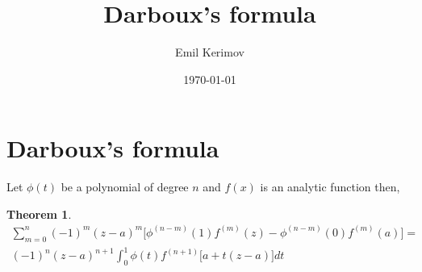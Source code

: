 \documentclass[a4paper]{article}
\title{Darboux's formula}
\author{Emil Kerimov}
\date{\today}
\begin{document}
\maketitle

\newtheorem{theorem}{Theorem}[section]
\newtheorem{corollary}{Corollary}[theorem]
\newtheorem{lemma}[theorem]{Lemma}
\newtheorem{definition}{Definition}[section]


\section{Darboux's formula}

Let $\phi(t)$ be a polynomial of degree $n$ and $f(x)$ is an analytic function then,

\begin{theorem}
\begin{multline} \label{Darboux's formula}
\sum_{m=0}^{n} (-1)^m (z-a)^m \Big[ \phi^{(n-m)}(1) f^{(m)}(z)  - \phi^{(n-m)}(0) f^{(m)}(a) \Big]
=
\\
(-1)^n (z-a)^{n+1} \int_{0}^{1} \phi(t) f^{(n+1)}\Big[a + t(z-a)\Big] dt
\end{multline}


\end{theorem}
\end{document}
